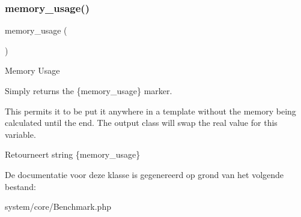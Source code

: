 \subsubsection{\texorpdfstring{memory\_usage()}{memory\_usage()}}
{\footnotesize\ttfamily memory\+\_\+usage (\begin{DoxyParamCaption}{ }\end{DoxyParamCaption})}

Memory Usage

Simply returns the \{memory\+\_\+usage\} marker.

This permits it to be put it anywhere in a template without the memory being calculated until the end. The output class will swap the real value for this variable.

\begin{DoxyReturn}{Retourneert}
string \textquotesingle{}\{memory\+\_\+usage\}\textquotesingle{} 
\end{DoxyReturn}


De documentatie voor deze klasse is gegenereerd op grond van het volgende bestand\+:\begin{DoxyCompactItemize}
\item 
system/core/Benchmark.\+php\end{DoxyCompactItemize}

